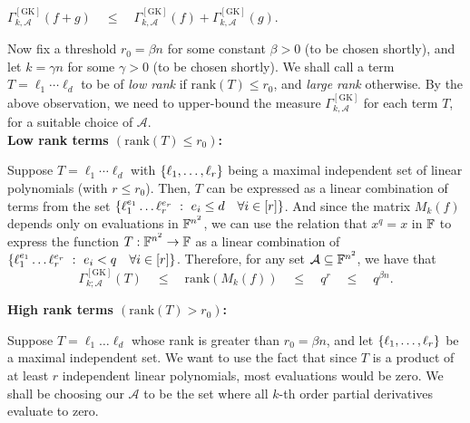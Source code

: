 \documentclass[12pt]{report}
\newcommand{\CM}[1]{\Gamma^{\mathrm{[#1]}}}
\begin{document}
\begin{observation}\label{obs:GK-subadditivity}
  $\CM{GK}_{k,\mathcal{A}}(f + g) \quad\leq\quad
  \CM{GK}_{k,\mathcal{A}}(f) +
  \CM{GK}_{k,\mathcal{A}}(g)$.
\end{observation}

Now fix a threshold $r_0 = \beta n$ for some constant $\beta > 0$ (to be
chosen shortly), and let $k = \gamma n$ for some $\gamma>0$ (to be
chosen shortly). We shall call a term $T = \ell_1\cdots \ell_d$ to be
of \emph{low rank} if $\mathrm{rank}(T) \leq r_0$, and \emph{large rank}
otherwise. By the above observation, we need to upper-bound the measure $\CM{GK}_{k,\mathcal{A}}$ for each term $T$, for a
suitable choice of $\mathcal{A}$.\\

\noindent 
{\bf Low rank terms $(\mathrm{rank}(T) \leq r_0)$:}

Suppose $T = \ell_1 \cdots \ell_d$ with $\left\{\ell_1, \dots,
  \ell_r\right\}$ being a maximal independent set of linear polynomials (with
$r \leq r_0$). Then, $T$ can be expressed as a linear combination of
terms from the set $\left\{{\ell_1^{e_1}\dots \ell_r^{e_r}}\ : \ {e_i\leq d
  \quad \forall i\in [r]}\right\}$. And since the matrix $M_k(f)$ depends only
on evaluations in $\mathbb{F}^{n^2}$, we can use the relation that $x^q = x$
in $\mathbb{F}$ to express the function $T:\mathbb{F}^{n^2}\rightarrow \mathbb{F}$ as a linear
combination of $\left\{{\ell_1^{e_1}\dots \ell_r^{e_r}}\ : \ {e_i<q \quad
  \forall i\in [r]}\right\}$. Therefore, for any set $\mathcal{A}\subseteq
\mathbb{F}^{n^2}$, we have that
$$
\CM{GK}_{k;\mathcal{A}}(T) \quad \leq \quad
\mathrm{rank}(M_k(f)) \quad \leq \quad q^r \quad\leq \quad q^{\beta{n}}.
$$


\noindent
{\bf High rank terms $(\mathrm{rank}(T) > r_0)$:}

Suppose $T = \ell_1\dots \ell_d$ whose rank is greater than $r_0 =
\beta n$, and let $\left\{\ell_1, \dots, \ell_r\right\}$ be a maximal
independent set. We want to use the fact that since $T$ is a product
of at least $r$ independent linear polynomials, most evaluations would
be zero. We shall be choosing our $\mathcal{A}$ to be the set where
all $k$-th order partial derivatives evaluate to zero. 
\end{document}
